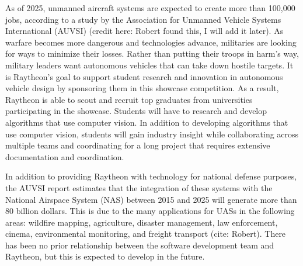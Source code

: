 
As of 2025, unmanned aircraft systems are expected to create more than 100,000 jobs, according to a study by the Association for Unmanned Vehicle Systems International (AUVSI) (credit here: Robert found this, I will add it later). As warfare becomes more dangerous and technologies advance, militaries are looking for ways to minimize their losses. Rather than putting their troops in harm's way, military leaders want autonomous vehicles that can take down hostile targets. It is Raytheon's goal to support student research and innovation in autonomous vehicle design by sponsoring them in this showcase competition. As a result, Raytheon is able to scout and recruit top graduates from universities participating in the showcase. Students will have to research and develop algorithms that use computer vision. In addition to developing algorithms that use computer vision, students will gain industry insight while collaborating across multiple teams and coordinating for a long project that requires extensive documentation and coordination.

In addition to providing Raytheon with technology for national defense purposes, the AUVSI report estimates that the integration of these systems with the National Airspace System (NAS) between 2015 and 2025 will generate more than 80 billion dollars. This is due to the many applications for UASs in the following areas: wildfire mapping, agriculture, disaster management, law enforcement, cinema, environmental monitoring, and freight transport (cite: Robert). There has been no prior relationship between the software development team and Raytheon, but this is expected to develop in the future.
